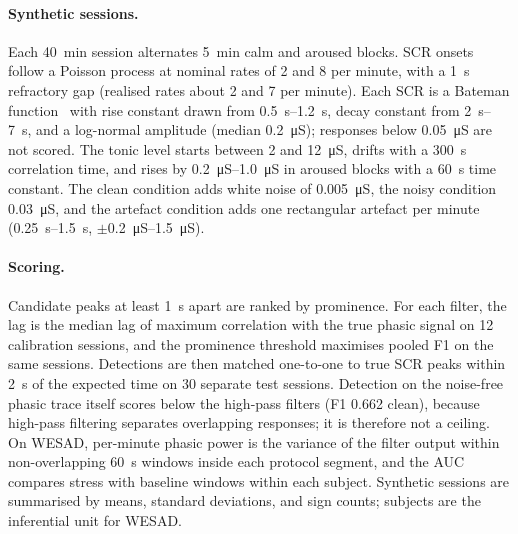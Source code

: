 \paragraph{Synthetic sessions.} Each \SI{40}{\minute} session alternates
\SI{5}{\minute} calm and aroused blocks. SCR onsets follow a Poisson process at
nominal rates of 2 and 8 per minute, with a \SI{1}{\second} refractory gap
(realised rates about 2 and 7 per minute). Each SCR is a Bateman function~\cite{BenedekKaernbach2010}
with rise constant drawn from \SIrange{0.5}{1.2}{\second}, decay constant from
\SIrange{2}{7}{\second}, and a log-normal amplitude (median \SI{0.2}{\micro\siemens});
responses below \SI{0.05}{\micro\siemens} are not scored. The tonic level starts
between 2 and \SI{12}{\micro\siemens}, drifts with a \SI{300}{\second} correlation
time, and rises by \SIrange{0.2}{1.0}{\micro\siemens} in aroused blocks with a
\SI{60}{\second} time constant. The clean condition adds white noise of
\SI{0.005}{\micro\siemens}, the noisy condition \SI{0.03}{\micro\siemens}, and the
artefact condition adds one rectangular artefact per minute
(\SIrange{0.25}{1.5}{\second}, \(\pm\)\SIrange{0.2}{1.5}{\micro\siemens}).

\paragraph{Scoring.} Candidate peaks at least \SI{1}{\second} apart are ranked by
prominence. For each filter, the lag is the median lag of maximum correlation with
the true phasic signal on 12 calibration sessions, and the prominence threshold
maximises pooled F1 on the same sessions. Detections are then matched one-to-one
to true SCR peaks within \SI{2}{\second} of the expected time on 30 separate test
sessions. Detection on the noise-free phasic trace itself scores below the
high-pass filters (F1 \num{0.662} clean), because high-pass filtering separates
overlapping responses; it is therefore not a ceiling. On WESAD, per-minute
phasic power is the variance of the filter output within non-overlapping
\SI{60}{\second} windows inside each protocol segment, and the AUC compares
stress with baseline windows within each subject. Synthetic sessions are
summarised by means, standard deviations, and sign counts; subjects are the
inferential unit for WESAD.

